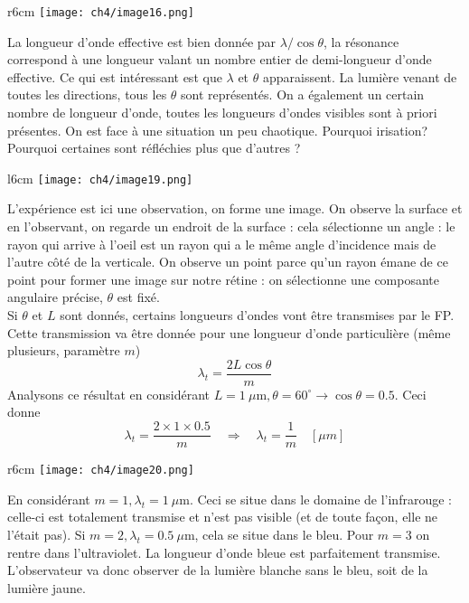 	\begin{wrapfigure}[11]{r}{6cm}
	\vspace{-5mm}
	\texttt{[image: ch4/image16.png]}
	\end{wrapfigure}
La longueur d'onde  
effective est bien donnée par $\lambda/\cos\theta$, la résonance correspond à une longueur valant 
un nombre entier de demi-longueur d'onde effective. Ce qui est intéressant est que $\lambda$ et 
$\theta$ apparaissent. La lumière venant de toutes les directions, tous les $\theta$ sont représentés.
On a également un certain nombre de longueur d'onde, toutes les longueurs d'ondes visibles sont à 
priori présentes. On est face à une situation un peu chaotique. Pourquoi irisation? Pourquoi certaines 
sont réfléchies plus que d'autres ? \\

	\begin{wrapfigure}[5]{l}{6cm}
	\vspace{-10mm}
	\texttt{[image: ch4/image19.png]}
	\end{wrapfigure}
L'expérience est ici une observation, on forme une image. On observe la surface et en l'observant, on 
regarde un endroit de la surface : cela sélectionne un angle : le rayon qui arrive à l'oeil est un 
rayon qui a le même angle d'incidence mais de l'autre côté de la verticale. On observe un point 
parce qu'un rayon émane de ce point pour former une image sur notre rétine : on sélectionne une 
composante angulaire précise, $\theta$ est fixé.\\

Si $\theta$ et $L$ sont donnés, certains longueurs d'ondes vont être transmises par le FP. Cette 
transmission va être donnée pour une longueur d'onde particulière (même plusieurs, paramètre $m$)
\begin{equation}
\lambda_t = \dfrac{2L\cos\theta}{m}
\end{equation}
Analysons ce résultat en considérant $L=1\ \mu\text{m}, \theta = 60^\circ \rightarrow \cos\theta = 
0.5$. Ceci donne 
\begin{equation}
\lambda_t = \dfrac{2\times1\times 0.5}{m}\quad\Longrightarrow\quad \lambda_t = \frac{1}{m}\quad [\mu 
m]
\end{equation}
	\begin{wrapfigure}[7]{r}{6cm}
	\vspace{-5mm}
	\texttt{[image: ch4/image20.png]}
	\end{wrapfigure}
En considérant $m=1, \lambda_t=1\ \mu\text{m}$. Ceci se situe dans le domaine de l'infrarouge : 
celle-ci est totalement transmise et n'est pas visible (et de toute façon, elle ne l'était pas). 
Si $m=2, \lambda_t=0.5\ \mu$m, cela se situe dans le bleu. Pour $m=3$ on rentre dans l'ultraviolet. 
La longueur d'onde bleue est parfaitement transmise. L'observateur va donc observer de la lumière 
blanche sans le bleu, soit de la lumière jaune.\\

